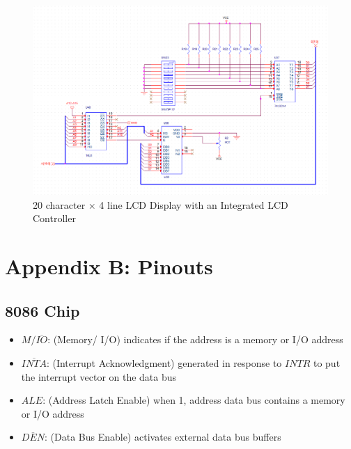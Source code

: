         \begin{figure}[ht]
            \begin{center}
                \includegraphics[width=1\textwidth]{figures/schematics/page11.png}
                \caption{20 character $\times$ 4 line LCD Display with an Integrated LCD Controller} \label{fig:page11}
            \end{center}
        \end{figure}


    \clearpage
    \newpage

    \section{Appendix B: Pinouts} \label{appendix:pinouts}

        \subsection{8086 Chip}

                \begin{itemize}

                    \item $M/\overline{IO}$: (Memory/ I/O) indicates if the address is a memory or I/O address

                    \item $\overline{INTA}$: (Interrupt Acknowledgment) generated in response to $INTR$ to put the interrupt vector on the data bus

                    \item $ALE$: (Address Latch Enable) when 1, address data bus contains a memory or I/O address

                    \item $\overline{DEN}$: (Data Bus Enable) activates external data bus buffers

                \end{itemize}


